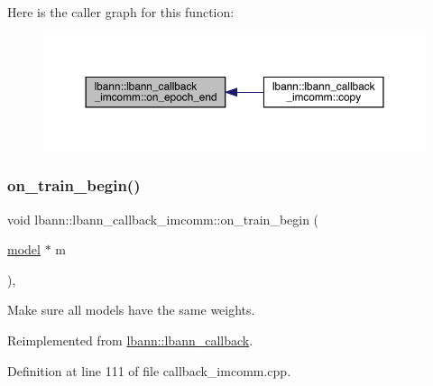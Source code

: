 Here is the caller graph for this function\+:\nopagebreak
\begin{figure}[H]
\begin{center}
\leavevmode
\includegraphics[width=350pt]{classlbann_1_1lbann__callback__imcomm_a3160dbf536def4f930e0ea0aabdebc11_icgraph}
\end{center}
\end{figure}
\mbox{\label{classlbann_1_1lbann__callback__imcomm_a332ba4ceca91939c79fae2735fdc8ff3}} 
\subsubsection{\texorpdfstring{on\+\_\+train\+\_\+begin()}{on\_train\_begin()}}
{\footnotesize\ttfamily void lbann\+::lbann\+\_\+callback\+\_\+imcomm\+::on\+\_\+train\+\_\+begin (\begin{DoxyParamCaption}\item[{\hyperlink{classlbann_1_1model}{model} $\ast$}]{m }\end{DoxyParamCaption})\hspace{0.3cm}{\ttfamily [override]}, {\ttfamily [virtual]}}

Make sure all models have the same weights. 

Reimplemented from \hyperlink{classlbann_1_1lbann__callback_a7c8f0d211967ccc5219144e92571ab26}{lbann\+::lbann\+\_\+callback}.



Definition at line 111 of file callback\+\_\+imcomm.\+cpp.


